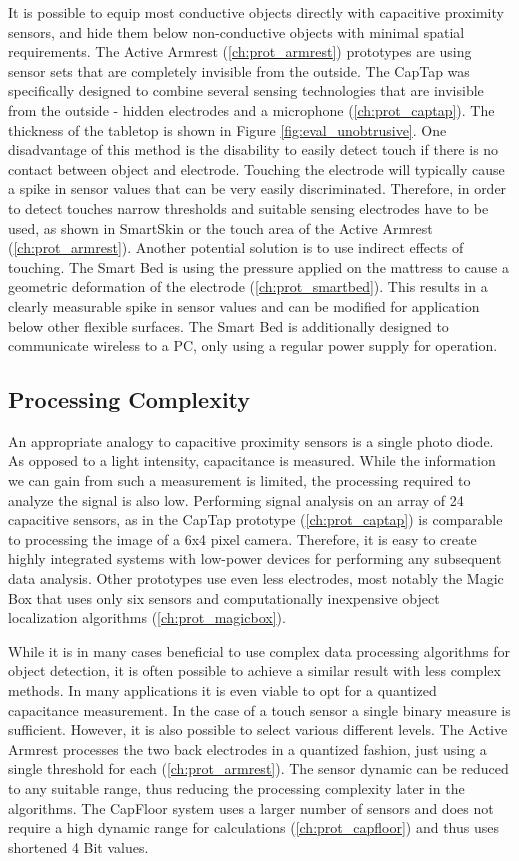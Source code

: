 It is possible to equip most conductive objects directly with capacitive proximity sensors, and hide them below non-conductive objects with minimal spatial requirements. The Active Armrest (\ref{ch:prot_armrest}) prototypes are using sensor sets that are completely invisible from the outside.  The CapTap was specifically designed to combine several sensing technologies that are invisible from the outside - hidden electrodes and a microphone (\ref{ch:prot_captap}). The thickness of the tabletop is shown in Figure \ref{fig:eval_unobtrusive}. One disadvantage of this method is the disability to easily detect touch if there is no contact between object and electrode. Touching the electrode will typically cause a spike in sensor values that can be very easily discriminated. Therefore, in order to detect touches narrow thresholds and suitable sensing electrodes have to be used, as shown in SmartSkin \cite{rekimoto2002smartskin} or the touch area of the Active Armrest (\ref{ch:prot_armrest}). Another potential solution is to use indirect effects of touching. The Smart Bed is using the pressure applied on the mattress to cause a geometric deformation of the electrode (\ref{ch:prot_smartbed}). This results in a clearly measurable spike in sensor values and can be modified for application below other flexible surfaces.
The Smart Bed is additionally designed to communicate wireless to a PC, only using a regular power supply for operation.
 
\subsection{Processing Complexity}
An appropriate analogy to capacitive proximity sensors is a single photo diode. As opposed to a light intensity, capacitance is measured. While the information we can gain from such a measurement is limited, the processing required to analyze the signal is also low. Performing signal analysis on an array of 24 capacitive sensors, as in the CapTap prototype (\ref{ch:prot_captap}) is comparable to processing the image of a 6x4 pixel camera. Therefore, it is easy to create highly integrated systems with low-power devices for performing any subsequent data analysis. Other prototypes use even less electrodes, most notably the Magic Box that uses only six sensors and computationally inexpensive object localization algorithms (\ref{ch:prot_magicbox}). 

While it is in many cases beneficial to use complex data processing algorithms for object detection, it is often possible to achieve a similar result with less complex methods. In many applications it is even viable to opt for a quantized capacitance measurement. In the case of a touch sensor a single binary measure is sufficient. However, it is also possible to select various different levels. The Active Armrest processes the two back electrodes in a quantized fashion, just using a single threshold for each (\ref{ch:prot_armrest}). The sensor dynamic can be reduced to any suitable range, thus reducing the processing complexity later in the algorithms. The CapFloor system uses a larger number of sensors and does not require a high dynamic range for calculations  (\ref{ch:prot_capfloor}) and thus uses shortened 4 Bit values.

